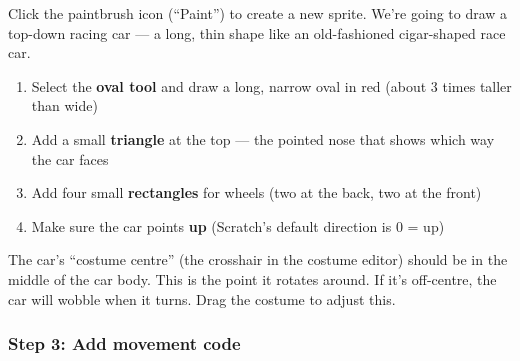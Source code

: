 \documentclass[11pt,a4paper]{article}
\newcommand{\drawcar}[4][]{%
  \begin{scope}[shift={(#2,#3)},rotate=#4,#1]
    \fill[carred,rounded corners=4pt] (-0.25,-0.6) rectangle (0.25,0.6);
    \fill[carred] (-0.2,0.6) -- (0,0.85) -- (0.2,0.6) -- cycle;
    \fill[black!80] (-0.35,-0.45) rectangle (-0.25,-0.25);
    \fill[black!80] (0.25,-0.45) rectangle (0.35,-0.25);
    \fill[black!80] (-0.35,0.25) rectangle (-0.25,0.45);
    \fill[black!80] (0.25,0.25) rectangle (0.35,0.45);
    \fill[white] (0,0) circle (0.04);
  \end{scope}
}
\begin{document}
Click the paintbrush icon (``Paint'') to create a new sprite. We're going to draw a top-down racing car --- a long, thin shape like an old-fashioned cigar-shaped race car.

\begin{center}
\end{center}

\begin{enumerate}
  \item Select the \textbf{oval tool} and draw a long, narrow oval in red (about 3 times taller than wide)
  \item Add a small \textbf{triangle} at the top --- the pointed nose that shows which way the car faces
  \item Add four small \textbf{rectangles} for wheels (two at the back, two at the front)
  \item Make sure the car points \textbf{up} (Scratch's default direction is 0 = up)
\end{enumerate}

\begin{parentbox}
The car's ``costume centre'' (the crosshair in the costume editor) should be in the middle of the car body. This is the point it rotates around. If it's off-centre, the car will wobble when it turns. Drag the costume to adjust this.
\end{parentbox}

\subsubsection{Step 3: Add movement code}
\end{document}
